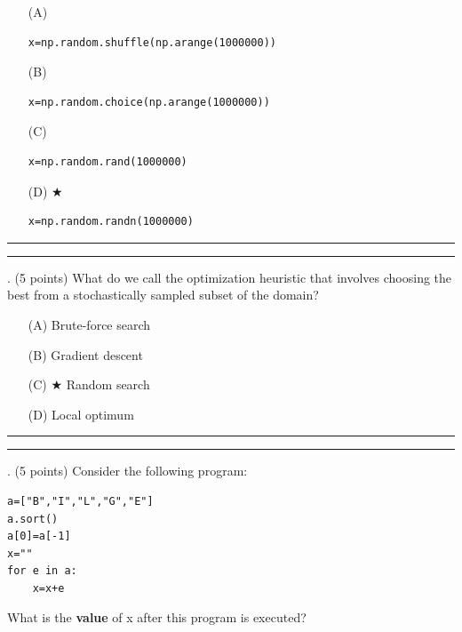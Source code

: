 \documentclass{article}
\begin{document}
\begin{enumerate}
\item[(A)]
\begin{verbatim}x=np.random.shuffle(np.arange(1000000))\end{verbatim}

\item[(B)]
\begin{verbatim}x=np.random.choice(np.arange(1000000))\end{verbatim}

\item[(C)]
\begin{verbatim}x=np.random.rand(1000000)\end{verbatim}

\item[(D)] $\bigstar$ 
\begin{verbatim}x=np.random.randn(1000000)\end{verbatim}

\end{enumerate}

\vspace*{2em}
\hrule
\vspace{2em}

\vspace{2em}
\hrule height 2pt


\newpage
{}. (5 points)
What do we call the optimization heuristic that involves choosing the best from a stochastically sampled subset of the domain?


\begin{enumerate}
\item[(A)]
Brute-force search

\item[(B)]
Gradient descent

\item[(C)] $\bigstar$ 
Random search

\item[(D)]
Local optimum

\end{enumerate}

\vspace*{2em}
\hrule
\vspace{2em}

\vspace{2em}
\hrule height 2pt


\newpage
{}. (5 points)
Consider the following program:
\begin{verbatim}
a=["B","I","L","G","E"]
a.sort()
a[0]=a[-1]
x=""
for e in a:
    x=x+e
\end{verbatim}
What is the \textbf{value} of x after this program is executed?
\end{document}
